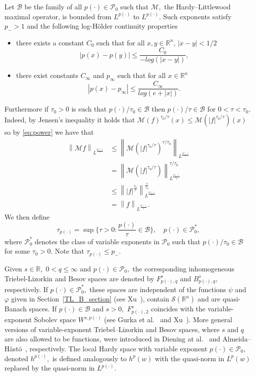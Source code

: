 \documentclass[10pt,a4paper]{article}
\theoremstyle{remark}
\newcommand{\re}{\mathbb{R}}
\newcommand{\rn}{{{\mathbb R}^n}}
\newcommand{\sw}{{\mathcal{S}}(\rn)}
\newcommand{\itl}[3]{F_{#1,#3}^{#2}} %
\newcommand{\ibes}[3]{B_{#1,#3}^{#2}} %
\newcommand{\lebw}[2]{L^{#1}(#2)} %
\newcommand{\Lp}{L^{p(\cdot)}} %
\newcommand{\pp}{{p(\cdot)}}
\newcommand{\M}{\mathcal{M}} %
\newcommand{\B}{\mathcal{B}}
\def\P{\mathcal P}
\newcommand{\fr}[2]{{\textstyle \frac{#1}{#2}}}
\newcommand{\norm}[2]{\left\|#1\right\|_{#2}}
\begin{document}
Let $\B$ be the family of all $\pp \in \P_0$ such that $\M,$  the Hardy--Littlewood maximal operator, is bounded from $\Lp$ to $\Lp.$ Such exponents satisfy $p_- > 1$ and the following log-H\"older continuity properties
\begin{itemize}
\item there exists a constant $C_0$ such that for all $x,y\in \rn$, $|x-y|<1/2$
\[ |p(x)-p(y)| \leq \frac{C_0}{-log(|x-y|)}, \]
\item there exist constants $C_\infty$ and $p_\infty$ such that for all $x\in\rn$ 
\[|p(x) - p_\infty| \leq \frac{C_\infty}{log(e + |x|)}.	 \]
\end{itemize}
Furthermore if 
$\tau_0 >0$ 
is such that 
$p(\cdot)/\tau_0 \in \B$ 
then $\pp/\tau \in \B$ for $0<\tau<\tau_0$. 
Indeed, by Jensen's inequality it holds that 
$\M(f)^{\tau_0/\tau}(x) 
\leq \M(|f|^{\tau_0/\tau})(x)$ 
so by \ref{eq:power} we have that 
\begin{align*}
\norm{\M f}{L^{\frac{p(\cdot)}{\tau}}} &\leq \norm{\M(|f|^{\tau_0/\tau})^{\tau/\tau_0}}{L^{\frac{p(\cdot)}{\tau}}} \\
& = \norm{\M(|f|^{\tau_0/\tau})}{L^{\frac{\pp}{\tau_0} }}^{\tau/\tau_0}\\
& \leq \norm{|f|^{\frac{\tau_0}{\tau}}}{L^{\frac{p(\cdot)}{\tau}}}^{\frac{\tau}{\tau_0}} \\
& = \norm{f}{L^{\frac{p(\cdot)}{\tau}}}.
\end{align*}
We then define
\begin{equation*}
\tau_{\pp}=\sup\{\tau>0:\fr{\pp}{\tau}\in \B\},\quad \pp\in \P_0^*,
\end{equation*}
where $\P_0^*$ denotes the class of variable exponents in $\P_0$ such that $\pp/\tau_0\in\B$ for some $\tau_0>0.$ Note that $\tau_{\pp}\le p_-.$


Given $s\in\re,$ $0<q\le \infty$ and $\pp\in\P_0,$ the corresponding inhomogeneous Triebel-Lizorkin and Besov spaces are denoted by $\itl{\pp}{s}{q}$  and  $\ibes{\pp}{s}{q},$
respectively. If $\pp\in\P_0^*,$ these spaces are independent of the functions $\psi$ and $\varphi$ given in  Section~\ref{TL_B_section} (see  Xu~\cite{MR2431378}), contain $\sw$ and are quasi-Banach spaces. If $\pp\in\B$ and $s>0,$ $\itl{\pp}{s}{2}$ coincides with the variable-exponent  Sobolev space $W^{s,\pp}$ (see Gurka et al.~\cite{MR2339558} and Xu~\cite{MR2449626}). More general versions of variable-exponent  Triebel--Lizorkin and Besov spaces, where $s$ and  $q$ are also allowed to be functions, were introduced in  Diening at al.~\cite{MR2498558} and Almeida--H\"ast\"o~\cite{MR2566313}, respectively. 
The local Hardy space with variable exponent $\pp\in \P_0,$  denoted $h^{\pp},$  is defined analogously to $h^p(w)$ with the quasi-norm in $\lebw{p}{w}$ replaced by the quasi-norm in $\Lp.$ 
\end{document}
